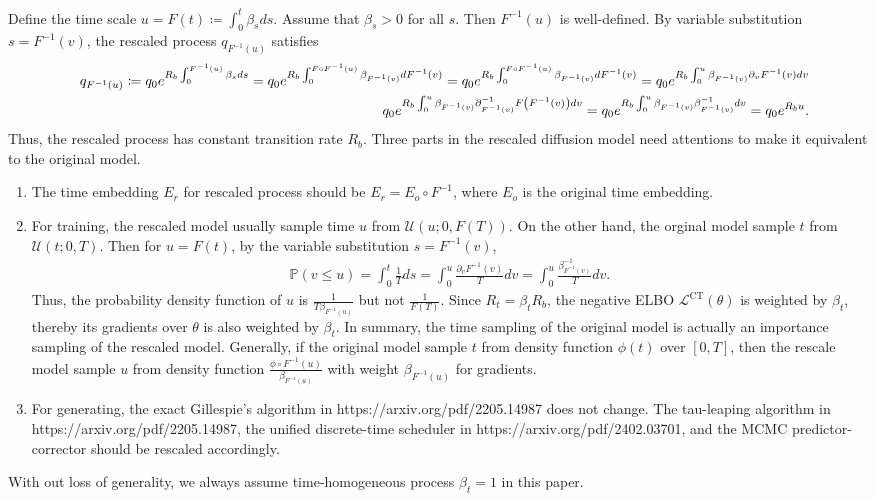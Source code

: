 \documentclass[10pt]{article}
\begin{document}
Define the time scale $u=F(t)\coloneqq\int_0^t\beta_s ds$. Assume that $\beta_s > 0$ for all $s$. Then $F^{-1}(u)$ is well-defined. By variable substitution $s=F^{-1}(v)$, the rescaled process $q_{F^{-1}(u)}$ satisfies
\begin{eqnarray*}
  &&q_{F^{-1}(u)}\coloneq q_0 e^{R_b \int_0^{F^{-1}(u)}\beta_s ds} = q_0 e^{R_b \int_0^{F\circ F^{-1}(u)}\beta_{F^{-1}(v)} dF^{-1}(v)}=q_0 e^{R_b \int_0^{F\circ F^{-1}(u)}\beta_{F^{-1}(v)} dF^{-1}(v)}=q_0 e^{R_b \int_0^u\beta_{F^{-1}(v)} \partial_v F^{-1}(v)dv}\\
  &&q_0 e^{R_b \int_0^u\beta_{F^{-1}(v)} \partial^{-1}_{F^{-1}(v)} F\qty(F^{-1}(v))dv}=q_0 e^{R_b \int_0^u\beta_{F^{-1}(v)}\beta^{-1}_{F^{-1}(v)}dv} =q_0 e^{R_b u}. 
\end{eqnarray*}
Thus, the rescaled process has constant transition rate $R_b$. Three parts in the rescaled diffusion model need attentions to make it equivalent to the original model.
\begin{enumerate}
  \item The time embedding $E_r$ for rescaled process should be $E_r=E_o\circ F^{-1}$, where $E_o$ is the original time embedding.
  \item For training, the rescaled model usually sample time $u$ from $\mathcal{U}(u;0,F(T))$. On the other hand, the orginal model sample $t$ from $\mathcal{U}(t;0,T)$. Then for $u=F(t)$, by the variable substitution $s=F^{-1}(v)$,
  \begin{eqnarray*}
    \mathbb{P}(v\le u)=\int_0^t\frac{1}{T} ds=\int_0^u\frac{\partial_v F^{-1}(v)}{T}dv=\int_0^u\frac{\beta^{-1}_{F^{-1}(v)}}{T}dv.
  \end{eqnarray*}  
  Thus, the probability density function of $u$ is $\frac{1}{T\beta_{F^{-1}(u)}}$ but not $\frac{1}{F(T)}$. Since $R_t = \beta_t R_b$, the negative ELBO $\mathcal{L}^\text{CT}(\theta)$ is weighted by $\beta_t$, thereby its gradients over $\theta$ is also weighted by $\beta_t$. In summary, the time sampling of the original model is actually an importance sampling of the rescaled model. Generally, if the original model sample $t$ from density function $\phi(t)$ over $[0,T]$, then the rescale model sample $u$ from density function $\frac{\phi\circ F^{-1}(u)}{\beta_{F^{-1}(u)}}$ with weight $\beta_{F^{-1}(u)}$ for gradients.
  \item For generating, the exact Gillespie's algorithm in https://arxiv.org/pdf/2205.14987 does not change. The tau-leaping algorithm in https://arxiv.org/pdf/2205.14987, the unified discrete-time scheduler in https://arxiv.org/pdf/2402.03701, and the MCMC predictor-corrector should be rescaled accordingly.
\end{enumerate}
With out loss of generality, we always assume time-homogeneous process $\beta_t=1$ in this paper.
\end{document}
